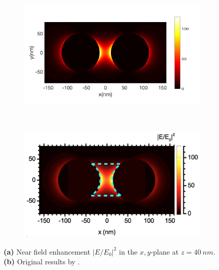 \begin{figure}[!h]
  \centering
  \begin{subfigure}{0.50\textwidth}
    \includegraphics[width=\textwidth]{./images/40nm.png}
  \end{subfigure}
  ~
  \begin{subfigure}{0.40\textwidth}
    \includegraphics[width=\textwidth]{./images/local-enhancement-heeg.png}
  \end{subfigure}
  \caption{\textbf{(a)} Near field enhancement $|E/E_0|^2$ in the $x,y$-plane at $z=\SI{40}{nm}$. \textbf{(b)} Original results by \cite{heeg}.}
\end{figure}



